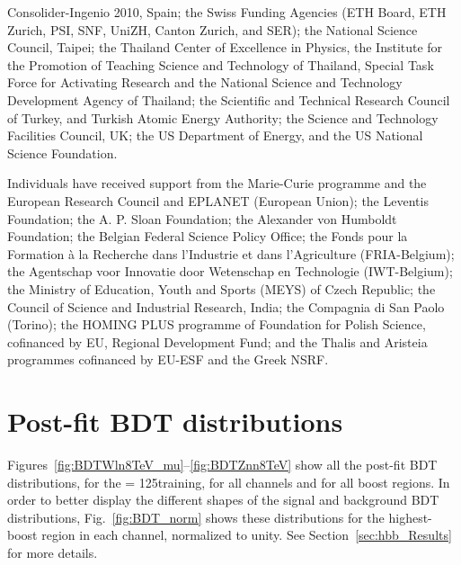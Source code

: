 \documentclass[11pt,twoside,a4paper,cmspaper,final,collab]{cms-tdr}
\begin{document}
Consolider-Ingenio 2010, Spain; the Swiss Funding Agencies (ETH Board, ETH Zurich, PSI, SNF, UniZH, Canton Zurich, and SER); the National Science Council, Taipei; the Thailand Center of Excellence in Physics, the Institute for the Promotion of Teaching Science and Technology of Thailand, Special Task Force for Activating Research and the National Science and Technology Development Agency of Thailand; the Scientific and Technical Research Council of Turkey, and Turkish Atomic Energy Authority; the Science and Technology Facilities Council, UK; the US Department of Energy, and the US National Science Foundation.

Individuals have received support from the Marie-Curie programme and the European Research Council and EPLANET (European Union); the Leventis Foundation; the A. P. Sloan Foundation; the Alexander von Humboldt Foundation; the Belgian Federal Science Policy Office; the Fonds pour la Formation \`a la Recherche dans l'Industrie et dans l'Agriculture (FRIA-Belgium); the Agentschap voor Innovatie door Wetenschap en Technologie (IWT-Belgium); the Ministry of Education, Youth and Sports (MEYS) of Czech Republic; the Council of Science and Industrial Research, India; the Compagnia di San Paolo (Torino); the HOMING PLUS programme of Foundation for Polish Science, cofinanced by EU, Regional Development Fund; and the Thalis and Aristeia programmes cofinanced by EU-ESF and the Greek NSRF.



\appendix

\section{Post-fit BDT distributions}\label{sec:hbb_Appendix}


Figures~\ref{fig:BDTWln8TeV_mu}--\ref{fig:BDTZnn8TeV} show all the post-fit
BDT distributions, for the  \mH = 125\GeV training, for all channels
and for all boost regions. In order to better display the
different shapes of the signal and background BDT distributions, Fig.~\ref{fig:BDT_norm} shows these
distributions for the highest-boost region in each
channel, normalized to unity. See Section~\ref{sec:hbb_Results} for more details.
\end{document}
